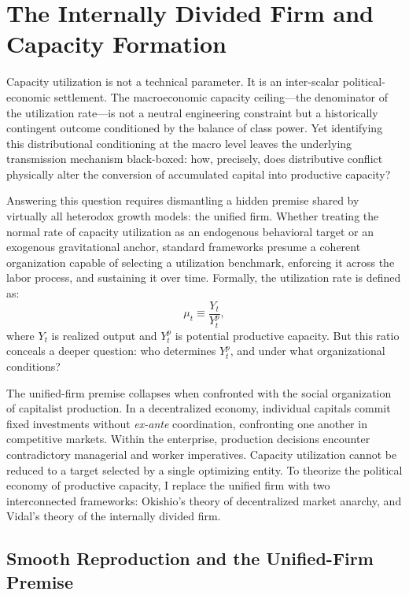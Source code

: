 \section{The Internally Divided Firm and Capacity Formation}
\label{sec:2:divided_firm}

Capacity utilization is not a technical parameter. It is an
inter-scalar political-economic settlement. The macroeconomic
capacity ceiling---the denominator of the utilization rate---is
not a neutral engineering constraint but a historically contingent
outcome conditioned by the balance of class power. Yet identifying
this distributional conditioning at the macro level leaves the
underlying transmission mechanism black-boxed: how, precisely,
does distributive conflict physically alter the conversion of
accumulated capital into productive capacity?

Answering this question requires dismantling a hidden premise
shared by virtually all heterodox growth models: the unified
firm. Whether treating the normal rate of capacity utilization
as an endogenous behavioral target or an exogenous gravitational
anchor, standard frameworks presume a coherent organization
capable of selecting a utilization benchmark, enforcing it across
the labor process, and sustaining it over time. Formally, the
utilization rate is defined as:
%
\begin{equation}\label{eq:utilization}
	\mu_t \equiv \frac{Y_t}{Y^p_t},
\end{equation}
%
\noindent where $Y_t$ is realized output and $Y^p_t$ is potential
productive capacity. But this ratio conceals a deeper question:
who determines $Y^p_t$, and under what organizational conditions?

The unified-firm premise collapses when confronted with the
social organization of capitalist production. In a decentralized
economy, individual capitals commit fixed investments without
\textit{ex-ante} coordination, confronting one another in
competitive markets. Within the enterprise, production decisions
encounter contradictory managerial and worker imperatives.
Capacity utilization cannot be reduced to a target selected by
a single optimizing entity. To theorize the political economy
of productive capacity, I replace the unified firm with two
interconnected frameworks: Okishio's theory of decentralized
market anarchy, and Vidal's theory of the internally divided
firm.

\subsection{Smooth Reproduction and the Unified-Firm Premise}

